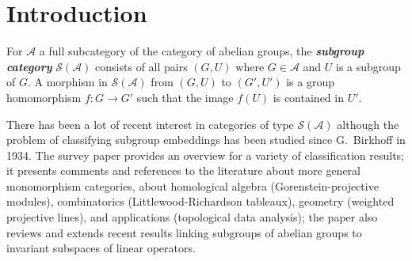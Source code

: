 \documentclass[twoside,leqno,12pt]{amsart}
\def\boldit#1{\textit{\textbf{#1}}}
\def\boldit#1{\textit{\textbf{#1}}}
\theoremstyle{definition}
\theoremstyle{remark}
\numberwithin{equation}{section}
\begin{document}
\begin{abstract}
In his 1934 paper, G.\ Birkhoff poses the problem of classifying pairs $(G,U)$
  where $G$ is an abelian group and $U\subset G$ a subgroup,
  up to automorphisms of $G$. In general, Birkhoff's Problem is not considered
  feasible.
  In this note, we fix a prime number $p$ and assume that $G$ is a direct sum of cyclic $p$-groups
  and $U\subset G$ is a~subgroup. Under the assumption that the factor group
  $G/U$ is an elementary abelian $p$-group,
  we show that the  pair $(G,U)$ always has a direct sum decomposition
  into pairs of type $(\mathbb Z/(p^n),\mathbb Z/(p^n))$ or $(\mathbb Z/(p^n), (p))$.
  Surprisingly, in the dual situation we need an additional condition.
  If we assume that $U$ itself is an elementary
  subgroup of $G$, then we show that
  the pair $(G,U)$ has a direct sum decomposition
  into pairs of type $(\mathbb Z/(p^n),0)$ or $(\mathbb Z/(p^n), (p^{n-1}))$
  if and only if $G/U$ is a~direct sum of cyclic $p$-groups.
  We generalize the above results to modules over commutative discrete valuation rings.
\end{abstract}

\maketitle


\section{Introduction}
For $\mathcal A$ a full subcategory of the category of abelian groups,
the \boldit{subgroup category} $\mathcal S(\mathcal A)$
consists of all pairs $(G,U)$ where $G\in\mathcal A$ and $U$ is a subgroup
of $G$.  A morphism in $\mathcal S(\mathcal A)$
from $(G,U)$ to $(G',U')$ is a group homomorphism
$f:G\to G'$ such that the image $f(U)$ is contained in $U'$.

  There has been a lot of recent interest in categories of type $\mathcal S(\mathcal A)$
  although the problem of classifying subgroup embeddings has been studied since G.\ Birkhoff \cite{b}
  in 1934.
  The survey paper \cite{k} provides an overview for a variety of classification results;
  it presents comments and references to the literature about more general monomorphism categories,
  about homological algebra (Gorenstein-projective modules), combinatorics (Littlewood-Richardson tableaux),
  geometry (weighted projective lines), and applications (topological data analysis); the paper also reviews
  and extends recent results linking subgroups of abelian groups to invariant subspaces of linear operators.
\end{document}
